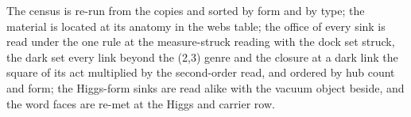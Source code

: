 The census is re-run from the copies and sorted by form and by type; the material is located at its anatomy in the webs table; the office of every sink is read under the one rule at the measure-struck reading with the dock set struck, the dark set every link beyond the (2,3) genre and the closure at a dark link the square of its act multiplied by the second-order read, and ordered by hub count and form; the Higgs-form sinks are read alike with the vacuum object beside, and the word faces are re-met at the Higgs and carrier row.

